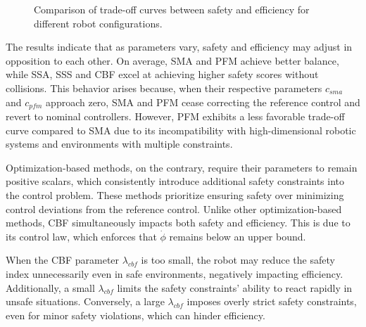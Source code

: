 \begin{figure}[htbp]
    \centering

    \caption{Comparison of trade-off curves between safety and efficiency for different robot configurations.}
    \label{fig: param_tuning_subset}
\end{figure}

The results indicate that as parameters vary, safety and efficiency may adjust in opposition to each other. On average, SMA and PFM achieve better balance, while SSA, SSS and CBF excel at achieving higher safety scores without collisions. This behavior arises because, when their respective parameters \(c_{sma}\) and \(c_{pfm}\) approach zero, SMA and PFM cease correcting the reference control and revert to nominal controllers. However, PFM exhibits a less favorable trade-off curve compared to SMA due to its incompatibility with high-dimensional robotic systems and environments with multiple constraints.

Optimization-based methods, on the contrary, require their parameters to remain positive scalars, which consistently introduce additional safety constraints into the control problem. These methods prioritize ensuring safety over minimizing control deviations from the reference control. Unlike other optimization-based methods, CBF simultaneously impacts both safety and efficiency. This is due to its control law, which enforces that \(\dot{\phi}\) remains below an upper bound.

When the CBF parameter \(\lambda_{cbf}\) is too small, the robot may reduce the safety index unnecessarily even in safe environments, negatively impacting efficiency. Additionally, a small \(\lambda_{cbf}\) limits the safety constraints' ability to react rapidly in unsafe situations. Conversely, a large \(\lambda_{cbf}\) imposes overly strict safety constraints, even for minor safety violations, which can hinder efficiency.

